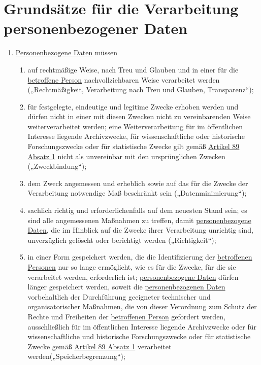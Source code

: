 \chapter{Grundsätze für die Verarbeitung personenbezogener Daten}
\label{ch:5}


\begin{enumerate}

  \item \hyperref[itm:04-1]{Personenbezogene Daten} müssen
  \label{itm:05-1}

  \begin{enumerate}
  
    \item auf rechtmäßige Weise, nach Treu und Glauben und in einer für die \hyperref[itm:04-1]{betroffene Person} nachvollziehbaren Weise
     verarbeitet werden („Rechtmäßigkeit, Verarbeitung nach Treu und Glauben, Transparenz“);
    \label{itm:05-1a}

    \item für festgelegte, eindeutige und legitime Zwecke erhoben werden und dürfen nicht in einer mit diesen Zwecken
     nicht zu vereinbarenden Weise weiterverarbeitet werden; eine Weiterverarbeitung für im öffentlichen Interesse
     liegende Archivzwecke, für wissenschaftliche oder historische Forschungszwecke oder für statistische Zwecke gilt
     gemäß \hyperref[itm:89-1]{Artikel 89 Absatz 1} nicht als unvereinbar mit den ursprünglichen
     Zwecken („Zweckbindung“);
    \label{itm:05-1b}

    \item dem Zweck angemessen und erheblich sowie auf das für die Zwecke der Verarbeitung notwendige Maß beschränkt
     sein („Datenminimierung“);
    \label{itm:05-1c}

    \item sachlich richtig und erforderlichenfalls auf dem neuesten Stand sein; es sind alle angemessenen Maßnahmen zu
     treffen, damit \hyperref[itm:04-1]{personenbezogene Daten}, die im Hinblick auf die Zwecke ihrer Verarbeitung unrichtig sind,
     unverzüglich gelöscht oder berichtigt werden („Richtigkeit“);
    \label{itm:05-1d}

    \item in einer Form gespeichert werden, die die Identifizierung der \hyperref[itm:04-1]{betroffenen Personen} nur so lange ermöglicht,
     wie es für die Zwecke, für die sie verarbeitet werden, erforderlich ist; \hyperref[itm:04-1]{personenbezogene Daten} dürfen länger
     gespeichert werden, soweit die \hyperref[itm:04-1]{personenbezogenen Daten} vorbehaltlich der Durchführung geeigneter technischer und
     organisatorischer Maßnahmen, die von dieser Verordnung zum Schutz der Rechte und Freiheiten der \hyperref[itm:04-1]{betroffenen Person}
     gefordert werden, ausschließlich für im öffentlichen Interesse liegende Archivzwecke oder für wissenschaftliche
     und historische Forschungszwecke oder für statistische Zwecke gemäß \hyperref[itm:89-1]{Artikel 89 Absatz 1}
     verarbeitet werden(„Speicherbegrenzung“);
    \label{itm:05-1e}


\end{enumerate}
\end{enumerate}

